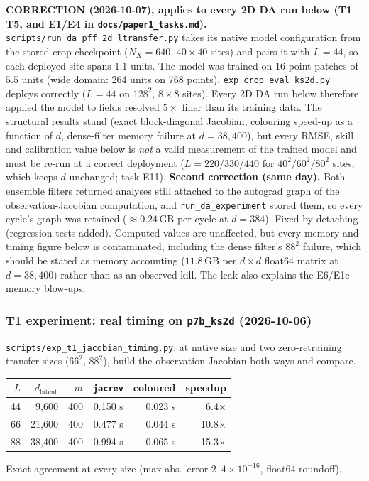 \documentclass[11pt]{article}
\begin{document}
\textbf{CORRECTION (2026-10-07), applies to every 2D DA run below (T1--T5,
and E1/E4 in \texttt{docs/paper1\_tasks.md}).}
\texttt{scripts/run\_da\_pff\_2d\_ltransfer.py} takes its native model
configuration from the stored crop checkpoint ($N_X{=}640$, $40\times40$
sites) and pairs it with $L{=}44$, so each deployed site spans $1.1$ units.
The model was trained on 16-point patches of $5.5$ units (wide domain:
264 units on 768 points). \texttt{exp\_crop\_eval\_ks2d.py} deploys
correctly ($L{=}44$ on $128^2$, $8\times8$ sites). Every 2D DA run below
therefore applied the model to fields resolved $5\times$ finer than its
training data. The structural results stand (exact block-diagonal Jacobian,
colouring speed-up as a function of $d$, dense-filter memory failure at
$d{=}38{,}400$), but every RMSE, skill and calibration value below is
\emph{not} a valid measurement of the trained model and must be re-run at
a correct deployment ($L{=}220/330/440$ for $40^2/60^2/80^2$ sites, which
keeps $d$ unchanged; task E11).
\textbf{Second correction (same day).} Both ensemble filters returned analyses
still attached to the autograd graph of the observation-Jacobian computation, and
\texttt{run\_da\_experiment} stored them, so every cycle's graph was retained
($\approx0.24$\,GB per cycle at $d{=}384$). Fixed by detaching (regression tests
added). Computed values are unaffected, but every memory and timing figure below
is contaminated, including the dense filter's $88^2$ failure, which should be
stated as memory accounting ($11.8$\,GB per $d\times d$ float64 matrix at
$d{=}38{,}400$) rather than as an observed kill. The leak also explains the
E6/E1c memory blow-ups.

\subsubsection*{T1 experiment: real timing on \texttt{p7b\_ks2d} (2026-10-06)}
\texttt{scripts/exp\_t1\_jacobian\_timing.py}: at native size and two
zero-retraining transfer sizes ($66^2$, $88^2$), build the observation
Jacobian both ways and compare.

\begin{center}
\begin{tabular}{rrrrrr}
\toprule
$L$ & $d_{\mathrm{latent}}$ & $m$ & \texttt{jacrev} & coloured & speedup \\
\midrule
44 & 9{,}600  & 400 & 0.150 s & 0.023 s & 6.4$\times$ \\
66 & 21{,}600 & 400 & 0.477 s & 0.044 s & 10.8$\times$ \\
88 & 38{,}400 & 400 & 0.994 s & 0.065 s & 15.3$\times$ \\
\bottomrule
\end{tabular}
\end{center}
Exact agreement at every size (max abs.\ error $2$--$4\times10^{-16}$,
float64 roundoff).
\end{document}
